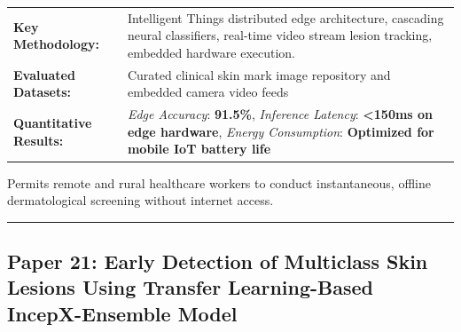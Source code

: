 \documentclass[10pt,a4paper]{article}
\begin{document}
\vspace{4pt}
\begin{tabularx}{\linewidth}{p{3.2cm}X}
\toprule
\textbf{Key Methodology:} & Intelligent Things distributed edge architecture, cascading neural classifiers, real-time video stream lesion tracking, embedded hardware execution. \\
\textbf{Evaluated Datasets:} & Curated clinical skin mark image repository and embedded camera video feeds \\
\textbf{Quantitative Results:} & \textit{Edge Accuracy}: \textbf{91.5\%}, \textit{Inference Latency}: \textbf{<150ms on edge hardware}, \textit{Energy Consumption}: \textbf{Optimized for mobile IoT battery life} \\
\bottomrule
\end{tabularx}
\vspace{4pt}
\begin{tcolorbox}[utilitybox,title=Clinical Utility and Real-World Impact]
Permits remote and rural healthcare workers to conduct instantaneous, offline dermatological screening without internet access.
\end{tcolorbox}
\vspace{12pt}
\hrule
\vspace{12pt}
\subsection*{Paper 21: Early Detection of Multiclass Skin Lesions Using Transfer Learning-Based IncepX-Ensemble Model}
\end{document}
